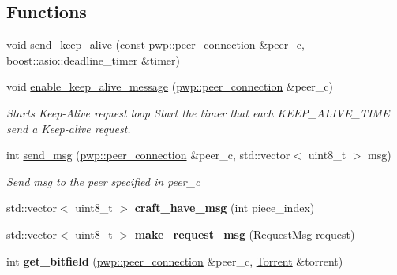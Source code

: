 \subsection*{Functions}
\begin{DoxyCompactItemize}
\item 
void \hyperlink{namespacepwp__msg_a9a577f5a53b823d83bb4694f1ebf141e}{send\+\_\+keep\+\_\+alive} (const \hyperlink{structpwp_1_1peer__connection}{pwp\+::peer\+\_\+connection} \&peer\+\_\+c, boost\+::asio\+::deadline\+\_\+timer \&timer)
\item 
void \hyperlink{namespacepwp__msg_a30c14bc06a8bb851ca79781cb9686b4f}{enable\+\_\+keep\+\_\+alive\+\_\+message} (\hyperlink{structpwp_1_1peer__connection}{pwp\+::peer\+\_\+connection} \&peer\+\_\+c)
\begin{DoxyCompactList}\small\item\em Starts Keep-\/\+Alive request loop Start the timer that each K\+E\+E\+P\+\_\+\+A\+L\+I\+V\+E\+\_\+\+T\+I\+ME send a Keep-\/alive request. \end{DoxyCompactList}\item 
int \hyperlink{namespacepwp__msg_aca807c6281879abef952f8feecccb6e8}{send\+\_\+msg} (\hyperlink{structpwp_1_1peer__connection}{pwp\+::peer\+\_\+connection} \&peer\+\_\+c, std\+::vector$<$ uint8\+\_\+t $>$ msg)
\begin{DoxyCompactList}\small\item\em Send {\ttfamily msg} to the peer specified in {\ttfamily peer\+\_\+c} \end{DoxyCompactList}\item 
\mbox{\label{namespacepwp__msg_a529a3db7938ccfaab85579d58e24061e}} 
std\+::vector$<$ uint8\+\_\+t $>$ {\bfseries craft\+\_\+have\+\_\+msg} (int piece\+\_\+index)
\item 
\mbox{\label{namespacepwp__msg_a2dcbe5fbe0eeca8910340f4978ee4235}} 
std\+::vector$<$ uint8\+\_\+t $>$ {\bfseries make\+\_\+request\+\_\+msg} (\hyperlink{structfileio_1_1RequestMsg}{Request\+Msg} \hyperlink{namespacepwp__msg_a0b9a29508f00a30e5138d2b78f4b1dafa4d6478c4fe948a9f3aa3ce8d09974370}{request})
\item 
\mbox{\label{namespacepwp__msg_aa9cc2ccac70638ed59075f27f938b8ec}} 
int {\bfseries get\+\_\+bitfield} (\hyperlink{structpwp_1_1peer__connection}{pwp\+::peer\+\_\+connection} \&peer\+\_\+c, \hyperlink{structtorr_1_1Torrent}{Torrent} \&torrent)

\end{DoxyCompactItemize}
